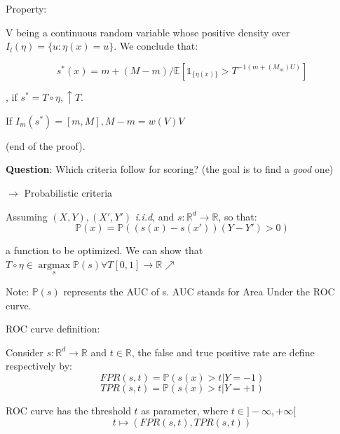 			Property:

			V being a continuous random variable whose positive density over $I_l(\eta)=\{u:\eta(x)=u\}$. We conclude that:

         \[
			    s^*(x)=m+(M-m)/\mathbb{E}[\mathds{1}_{\{\eta(x)\}}>T^{-1(m+(M_m)U)}]
			\]

			, if $s^*=T\circ\eta,\uparrow T$.
			
			If $I_m(s^*)=[m,M],M-m=w(V)V$

			(end of the proof). 

			\textbf{Question}: Which criteria follow for scoring? (the goal is to find a \emph{good} one)
			
			$\rightarrow$ Probabilistic criteria

			Assuming $(X,Y),(X',Y')$ \emph{i.i.d}, and $s:\mathbb{R}^d\rightarrow\mathbb{R}$, so that:
         \[
			    \mathbb{P}(x)=\mathbb{P}((s(x)-s(x'))(Y-Y')>0)
			\]

			a function to be optimized. We can show that $T\circ\eta\in\underset{s}{\operatorname{argmax}}\mathbb{P}(s)\forall T[0,1]\rightarrow\mathbb{R}\nearrow$

			Note: $\mathbb{P}(s)$ represents the AUC of s. AUC stands for Area Under the ROC curve.

			ROC curve definition:
			
			Consider $s:\mathbb{R}^d\rightarrow\mathbb{R}$ and $t\in\mathbb{R}$, the false and true positive rate are define respectively by:
         \[
			    FPR(s,t)=\mathbb{P}(s(x)>t|Y=-1)
			\]
         \[
			    TPR(s,t)=\mathbb{P}(s(x)>t|Y=+1)
			\]

			ROC curve has the threshold $t$ as parameter, where $t\in]-\infty,+\infty[$
         \[
			    t\longmapsto(FPR(s,t),TPR(s,t))
			\]
			
